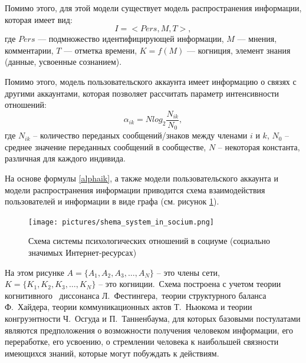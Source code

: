 Помимо этого, для этой модели существует модель распространения информации, которая имеет вид:
\begin{equation}
    I = <Pers, M, T>,
\end{equation}
где $Pers$ — подмножество идентифицирующей информации, $M$ — мнения, комментарии,
$T$ — отметка времени, $K = f(M)$ — когниция, элемент знания (данные, усвоенные сознанием).

Помимо этого, модель пользовательского аккаунта имеет информацию о связях с другими аккаунтами,
которая позволяет рассчитать параметр интенсивности отношений:
\begin{equation}\label{alphaik}
    \alpha_{ik} = N log_{2} \frac{N_{ik}}{N_{0}},
\end{equation}
где $N_{ik}$ – количество переданых сообщений/знаков между членами $i$ и $k$,
$N_{0}$ – среднее значение переданных сообщений в сообществе, $N$ – некоторая константа, различная для каждого индивида.

На основе формулы \ref{alphaik}, а также модели пользовательского аккаунта и модели распространения информации
приводится схема взаимодействия пользователей и информации в виде графа (см. рисунок \ref{fig:shema_system_in_socium}).

\begin{figure}[h!]
    \centering
    \captionsetup{justification=centering}
    \texttt{[image: pictures/shema\_system\_in\_socium.png]}
    \caption{Схема системы психологических отношений в социуме (социально значимых Интернет-ресурсах)}
    \label{fig:shema_system_in_socium}
\end{figure}

На этом рисунке $A = \{ A_{1}, A_{2}, A_{3}, \dots, A_{N}\}$ – это члены сети,
$K = \{ K_{1}, K_{2}, K_{3}, \dots, K_{N}\}$ – это когниции.~Схема построена с учетом теории когнитивного
~диссонанса Л.~Фестингера,~теории структурного баланса Ф.~Хайдера, теории коммуникационных актов Т.~Ньюкома
и теории конгруэнтности Ч.~Осгуда и П.~Танненбаума, для которых базовыми постулатами являются предположения
о возможности получения человеком информации, его переработке, его усвоению, о стремлении человека к наибольшей
связности имеющихся знаний, которые могут побуждать к действиям.

